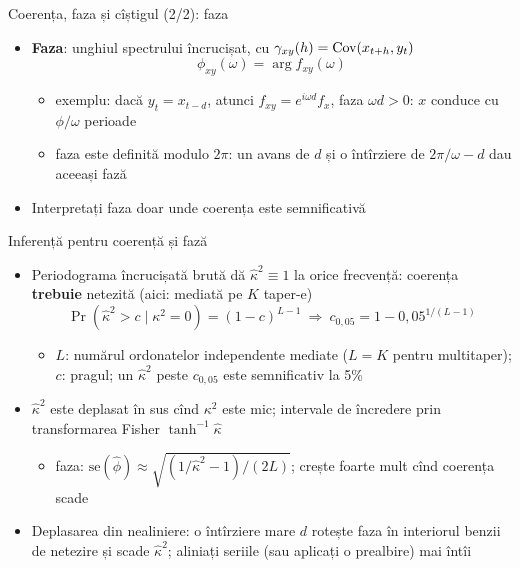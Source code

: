\begin{frame}{Coerența, faza și cîștigul (2/2): faza}
\itemsize{\small}
\begin{itemize}
    \item \textbf{Faza}: unghiul spectrului încrucișat, cu $\gamma_{xy}(h) = \text{Cov}(x_{t+h}, y_t)$
    \[ \phi_{xy}(\omega) = \arg f_{xy}(\omega) \]
    \begin{itemize}
        \item exemplu: dacă $y_t = x_{t-d}$, atunci $f_{xy} = e^{i\omega d}f_x$, faza $\omega d > 0$: $x$ conduce cu $\phi/\omega$ perioade
        \item faza este definită modulo $2\pi$: un avans de $d$ și o întîrziere de $2\pi/\omega - d$ dau aceeași fază
    \end{itemize}
    \item Interpretați faza doar unde coerența este semnificativă
\end{itemize}
\end{frame}

\begin{frame}{Inferență pentru coerență și fază}
\itemsize{\small}
\begin{itemize}
    \item Periodograma încrucișată brută dă $\hat\kappa^2 \equiv 1$ la orice frecvență: coerența \textbf{trebuie} netezită (aici: mediată pe $K$ taper-e)
    \[ \Pr(\hat\kappa^2 > c \mid \kappa^2 = 0) = (1 - c)^{L-1} \ \Rightarrow\ c_{0{,}05} = 1 - 0{,}05^{1/(L-1)} \]
    \begin{itemize}
        \item $L$: numărul ordonatelor independente mediate ($L = K$ pentru multitaper); $c$: pragul; un $\hat\kappa^2$ peste $c_{0{,}05}$ este semnificativ la 5\%
    \end{itemize}
    \item $\hat\kappa^2$ este deplasat în sus cînd $\kappa^2$ este mic; intervale de încredere prin transformarea Fisher $\tanh^{-1}\hat\kappa$ 
    \begin{itemize}
        \item faza: $\mathrm{se}(\hat\phi) \approx \sqrt{(1/\hat\kappa^2 - 1)/(2L)}$; crește foarte mult cînd coerența scade
    \end{itemize}
    \item Deplasarea din nealiniere: o întîrziere mare $d$ rotește faza în interiorul benzii de netezire și scade $\hat\kappa^2$; aliniați seriile (sau aplicați o prealbire) mai întîi
\end{itemize}
\end{frame}


